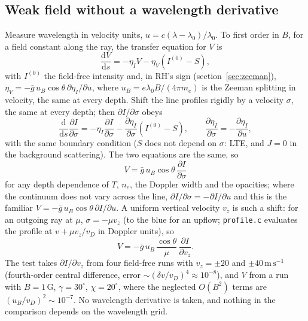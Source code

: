 \documentclass[11pt,a4paper]{article}
\newcommand{\code}[1]{\texttt{#1}}
\newcommand{\dd}{\mathrm{d}}
\begin{document}
\subsection{Weak field without a wavelength derivative}
Measure wavelength in velocity units, $u = c(\lambda-\lambda_0)/\lambda_0$.
To first order in $B$, for a field constant along the ray, the
transfer equation for $V$ is
\begin{equation}
\frac{\dd V}{\dd s} = -\eta_I V - \eta_V(I^{(0)}-S),
\end{equation}
with $I^{(0)}$ the field-free intensity and, in RH's sign
(section~\ref{sec:zeeman}),
$\eta_V=-\bar g\,u_B\cos\theta\,\partial\eta_I/\partial u$, where
$u_B = e\lambda_0B/(4\pi m_e)$ is the Zeeman splitting in velocity, the
same at every depth. Shift the line profiles rigidly by a velocity
$\sigma$, the same at every depth; then $\partial I/\partial\sigma$ obeys
\begin{equation}
\frac{\dd}{\dd s}\frac{\partial I}{\partial\sigma}
= -\eta_I\frac{\partial I}{\partial\sigma}
 - \frac{\partial\eta_I}{\partial\sigma}(I^{(0)}-S),
\qquad \frac{\partial\eta_I}{\partial\sigma} = -\frac{\partial\eta_I}{\partial u},
\end{equation}
with the same boundary condition ($S$ does not depend on $\sigma$: LTE,
and $J=0$ in the background scattering). The two equations are the same,
so
\begin{equation}
V = \bar g\,u_B\cos\theta\,\frac{\partial I}{\partial\sigma}
\end{equation}
for any depth dependence of $T$, $n_e$, the Doppler width and the
opacities; where the continuum does not vary across the line,
$\partial I/\partial\sigma = -\partial I/\partial u$ and this is the
familiar $V=-\bar g\,u_B\cos\theta\,\partial I/\partial u$. A uniform
vertical velocity $v_z$ is such a shift: for an outgoing ray at $\mu$,
$\sigma=-\mu v_z$ (to the blue for an upflow; \code{profile.c} evaluates
the profile at $v+\mu v_z/v_D$ in Doppler units), so
\begin{equation}
V = -\bar g\,u_B\,\frac{\cos\theta}{\mu}\,\frac{\partial I}{\partial v_z}.
\end{equation}
The test takes $\partial I/\partial v_z$ from four field-free runs with
$v_z=\pm20$ and $\pm40\,\mathrm{m\,s^{-1}}$ (fourth-order central
difference, error $\sim(\delta v/v_D)^4\approx10^{-8}$), and $V$ from a run
with $B=1$\,G, $\gamma=30^\circ$, $\chi=20^\circ$, where the neglected
$O(B^2)$ terms are $(u_B/v_D)^2\sim10^{-7}$. No wavelength derivative is
taken, and nothing in the comparison depends on the wavelength grid.
\end{document}
